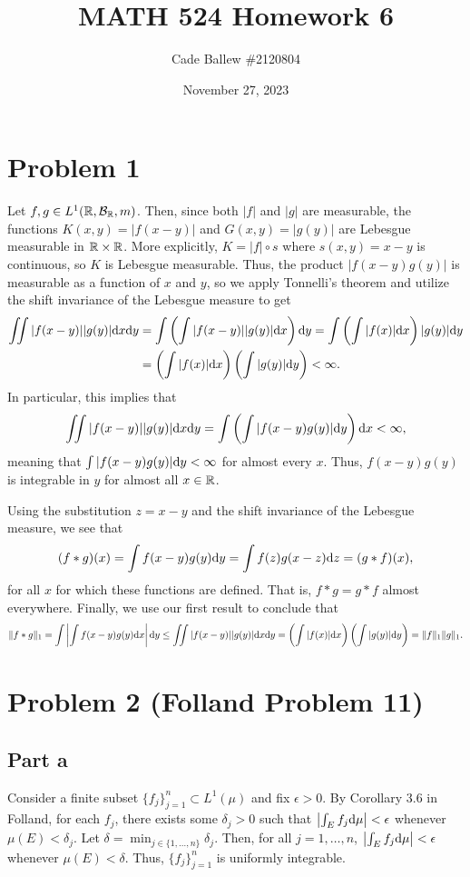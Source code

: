 \documentclass{article}
\title{MATH 524 Homework 6}
\author{Cade Ballew \#2120804}
\date{November 27, 2023}
\begin{document}
	
\maketitle
	
\section{Problem 1}
Let $f,g\in L^1(\mathbb{R},{\cal B}_{\mathbb{R}},m)$. Then, since both $|f|$ and $|g|$ are measurable, the functions $K(x,y)=|f(x-y)|$ and $G(x,y)=|g(y)|$ are Lebesgue measurable in $\mathbb{R}\times\mathbb{R}$. More explicitly, $K=|f|\circ s$ where $s(x,y)=x-y$ is continuous, so $K$ is Lebesgue measurable. Thus, the product $|f(x-y)g(y)|$ is measurable as a function of $x$ and $y$, so we apply Tonnelli's theorem and utilize the shift invariance of the Lebesgue measure to get
\begin{align*}
\iint |f(x-y)||g(y)|\mathrm{d} x\mathrm{d} y&=\int\left(\int |f(x-y)||g(y)| \mathrm{d} x\right)\mathrm{d} y=\int\left(\int |f(x)| \mathrm{d} x\right)|g(y)|\mathrm{d} y\\&=\left(\int |f(x)| \mathrm{d} x\right)\left(\int |g(y)| \mathrm{d} y\right)<\infty.
\end{align*}
In particular, this implies that 
\[
\iint |f(x-y)||g(y)|\mathrm{d} x\mathrm{d} y=\int\left(\int |f(x-y)g(y)| \mathrm{d} y\right)\mathrm{d} x<\infty,
\]
meaning that $\int |f(x-y)g(y)| \mathrm{d} y<\infty$ for almost every $x$. Thus, $f(x-y)g(y)$ is integrable in $y$ for almost all $x\in\mathbb{R}$. 

Using the substitution $z=x-y$ and the shift invariance of the Lebesgue measure, we see that
\[
(f\ast g)(x)=\int f(x-y)g(y)\mathrm{d} y=\int f(z)g(x-z)\mathrm{d} z=(g\ast f)(x),
\]
for all $x$ for which these functions are defined. That is, $f\ast g=g\ast f$ almost everywhere. Finally, we use our first result to conclude that
\[
\|f\ast g\|_1=\int\left|\int f(x-y)g(y)\mathrm{d} x\right|\mathrm{d} y\leq\iint |f(x-y)||g(y)|\mathrm{d} x\mathrm{d} y=\left(\int |f(x)| \mathrm{d} x\right)\left(\int |g(y)| \mathrm{d} y\right)=\|f\|_1\|g\|_1.
\]

\section{Problem 2 (Folland Problem 11)}
\subsection{Part a}
Consider a finite subset $\{f_j\}_{j=1}^n\subset L^1(\mu)$ and fix $\epsilon>0$. By Corollary 3.6 in Folland, for each $f_j$, there exists some $\delta_j>0$ such that $\left|\int_Ef_j\mathrm{d}\mu\right|<\epsilon$ whenever $\mu(E)<\delta_j$. Let $\delta=\min_{j\in\{1,\ldots,n\}}\delta_j$. Then, for all $j=1,\ldots,n$, $\left|\int_Ef_j\mathrm{d}\mu\right|<\epsilon$ whenever $\mu(E)<\delta$. Thus, $\{f_j\}_{j=1}^n$ is uniformly integrable. 
\end{document}
